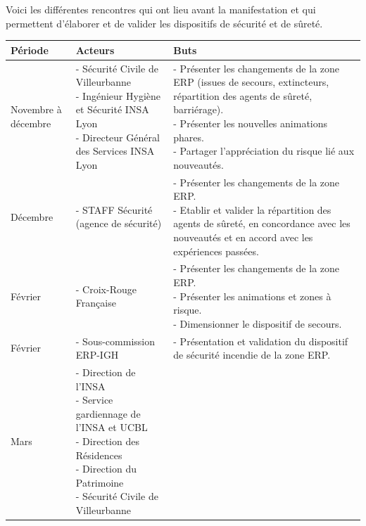 \documentclass[hidelinks, paper=a4, fontsize=13pt]{report}
\begin{document}
Voici les différentes rencontres qui ont lieu avant la manifestation et qui permettent d'élaborer et de valider les dispositifs de sécurité et de sûreté.\\

\begin{center}
\begin{tabular}{| p{2cm} | p{5.5cm} | p{8cm} |}
\shrinkheight{1cm} 

  \hline
  \cellcolor[gray]{0.9} \textbf{Période} & \cellcolor[gray]{0.9} \textbf{Acteurs} & \cellcolor[gray]{0.9} \textbf{Buts} \\
  \hline
  Novembre à décembre & 
  \parbox[t]{5.5cm}{- Sécurité Civile de Villeurbanne\\
  - Ingénieur Hygiène et Sécurité INSA Lyon\\
  - Directeur Général des Services INSA Lyon} & 
  \parbox[t]{8cm}{- Présenter les changements de la zone ERP (issues de secours, extincteurs, répartition des agents de sûreté, barriérage).\\
  - Présenter les nouvelles animations phares.\\
  - Partager l'appréciation du risque lié aux nouveautés.}
 \\
 \hline
  Décembre &
  \parbox[t]{5.5cm}{- STAFF Sécurité (agence de sécurité)} & 
  \parbox[t]{8cm}{- Présenter les changements de la zone ERP.\\
  - Etablir et valider la répartition des agents de sûreté, en concordance avec les nouveautés et en accord avec les expériences passées.}
 \\
 \hline
  Février &
  \parbox[t]{5.5cm}{- Croix-Rouge Française} & 
  \parbox[t]{8cm}{- Présenter les changements de la zone ERP.\\
  - Présenter les animations et zones à risque.\\
  - Dimensionner le dispositif de secours.}
 \\
 \hline
  Février &
  \parbox[t]{5.5cm}{- Sous-commission ERP-IGH} & 
  \parbox[t]{8cm}{- Présentation et validation du dispositif de sécurité incendie de la zone ERP.}
 \\
 \hline
  Mars &
  \parbox[t]{5.5cm}{- Direction de l'INSA\\
  - Service gardiennage de l'INSA et UCBL\\
  - Direction des Résidences\\
  - Direction du Patrimoine\\
  - Sécurité Civile de Villeurbanne\\
}
\end{tabular}
\end{center}
\end{document}
